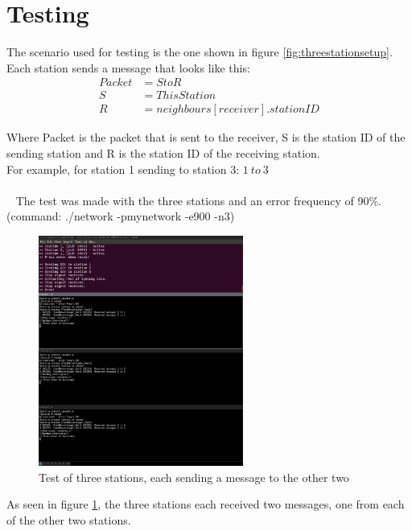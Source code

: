 \section{Testing}
The scenario used for testing is the one shown in figure \ref{fig:threestationsetup}.\\
Each station sends a message that looks like this:
\begin{align*}
Packet &= S to R\\
S &= ThisStation\\
R &= neighbours[receiver].stationID
\end{align*}

Where Packet is the packet that is sent to the receiver, S is the station ID of the sending station and R is the station ID of the receiving station.\\
For example, for station 1 sending to station 3: $1\ to\ 3$\\
\\~
The test was made with the three stations and an error frequency of 90\%. (command: ./network -pmynetwork -e900 -n3)
\begin{figure}[H]
\centering
\includegraphics[width=0.6\textwidth]{Test1.png}
\caption{Test of three stations, each sending a message to the other two}
\label{fig:threestationtest}
\end{figure}

As seen in figure \ref{fig:threestationtest}, the three stations each received two messages, one from each of the other two stations.



